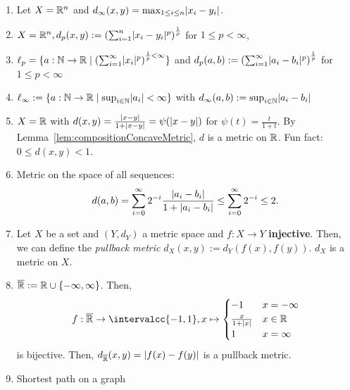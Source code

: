 \documentclass[language=english]{../../Template/TemplateLecture}
\begin{document}
\begin{beispiel}
    \begin{enumerate}[$(i)$]
        \item Let $X = \mathbb{R}^n$ and $d_\infty(x,y) = \max_{1 \leq i \leq n} \lvert x_i - y_i\rvert$.
        \item $X = \mathbb{R}^n, d_p(x,y) := \left(\sum_{i=1}^n \lvert x_i - y_i\rvert^p\right)^{\frac{1}{p}}$ for $1 \leq p < \infty$,
        \item $\ell_p = \{a: \mathbb{N} \to \mathbb{R} \mid \left(\sum_{i=1}^\infty \lvert x_i\rvert^p\right)^{\frac{1}{p} < \infty}\}$ and $d_p(a,b) := \left(\sum_{i=1}^\infty \lvert a_i - b_i\rvert^p\right)^{\frac{1}{p}}$ for $1 \leq p < \infty$
        \item $\ell_\infty := \{a: \mathbb{N} \to \mathbb{R} \mid \sup_{i \in \mathbb{N}} \lvert a_i\rvert < \infty\}$ with $d_\infty(a,b) := \sup_{i \in \mathbb{N}} \lvert a_i - b_i\rvert$
        \item $X = \mathbb{R}$ with $d(x,y) = \frac{\lvert x-y\rvert}{1+\lvert x-y\rvert} = \psi(\lvert x-y\rvert)$ for $\psi(t) = \frac{t}{1+t}$. By Lemma~\ref{lem:compositionConcaveMetric}, $d$ is a metric on $\mathbb{R}$. Fun fact: $0 \leq d(x,y) < 1$.
        \item Metric on the space of all sequences:
        \begin{equation}
            d(a,b) = \sum_{i = 0}^\infty 2^{-i} \frac{\lvert a_i - b_i\rvert}{1 + \lvert a_i - b_i\rvert} \leq \sum_{i = 0}^\infty 2^{-i} \leq 2.
        \end{equation}
        \item Let $X$ be a set and $(Y, d_Y)$ a metric space and $f: X \to Y$ \textbf{injective}. Then, we can define the \emph{pullback metric} $d_X(x,y) := d_Y(f(x),f(y))$. $d_X$ is a metric on $X$.
        \item $\overline{\mathbb{R}} := \mathbb{R} \cup \{-\infty,\infty\}$. Then, 
        \begin{equation}
            f: \overline{\IR} \to \intervalcc{-1,1}, x \mapsto \begin{cases}
                -1 & x = -\infty \\ \frac{x}{1+\abs{x}} & x \in \IR \\ 1 & x = \infty
            \end{cases}
        \end{equation}
        is bijective. Then, $d_{\overline{\mathbb{R}}}(x,y) = \lvert f(x)-f(y)\rvert$ is a pullback metric.
        \item Shortest path on a graph
    \end{enumerate}
\end{beispiel}
\end{document}
